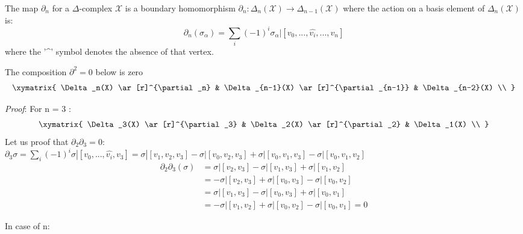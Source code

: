 \documentclass[11pt,a4paper]{report}
\begin{document}
		      The map $\partial_n$ for a $\Delta$-complex $\mathcal{X}$ is a boundary homomorphism 
		      $\partial_n: \Delta_n(\mathcal{X}) \rightarrow \Delta_{n-1}(\mathcal{X})$ where the action on a basis element of $\Delta_n(\mathcal{X})$ is: 
		      \[
		         \partial_n(\sigma_\alpha) = \sum\limits_i (-1)^i \sigma_\alpha | [v_0, ... ,\hat{v_i}, ... , v_n]
              \] 
            where the '\^{}' symbol denotes the absence of that vertex.
            
            \begin{Lemma}
             The composition $\partial^2=0$ below is zero 
             \[
                \xymatrix{
                    \Delta_n(X)  \ar[r]^{\partial_n} & 
                    \Delta_{n-1}(X)  \ar[r]^{\partial_{n-1}} & 
                    \Delta_{n-2}(X)   \\ }
             \]
            \end{Lemma}

            \emph{Proof}: For n = 3 :
             \[
                \xymatrix{
                    \Delta_3(X)  \ar[r]^{\partial_3} & 
                    \Delta_2(X)  \ar[r]^{\partial_2} & 
                    \Delta_1(X)   \\ }
             \]
             Let us proof that $\partial_2 \partial_3 = 0$: \\
             $\partial_3\sigma = \sum\limits_i (-1)^i \sigma | [v_0, ... ,\hat{v_i}, v_3] = 
             \sigma | [v_1, v_2, v_3] - \sigma | [v_0, v_2, v_3] + \sigma | [v_0, v_1, v_3] - \sigma | [v_0, v_1, v_2]$ \\
             
          
            \begin{equation}
                \begin{aligned}
                    \partial_2 \partial_3(\sigma) &= \sigma | [v_2, v_3] - \sigma | [v_1, v_3] + \sigma | [v_1, v_2] \\
                    &= -\sigma | [v_2, v_3] + \sigma | [v_0, v_3] - \sigma | [v_0, v_2] \\
                    &= \sigma | [v_1, v_3] - \sigma | [v_0, v_3] + \sigma | [v_0, v_1] \\
                    &= -\sigma | [v_1, v_2] + \sigma | [v_0, v_2] - \sigma | [v_0, v_1] = 0 
                \end{aligned}
            \end{equation}
            
        In case of n:
        
\end{document}
